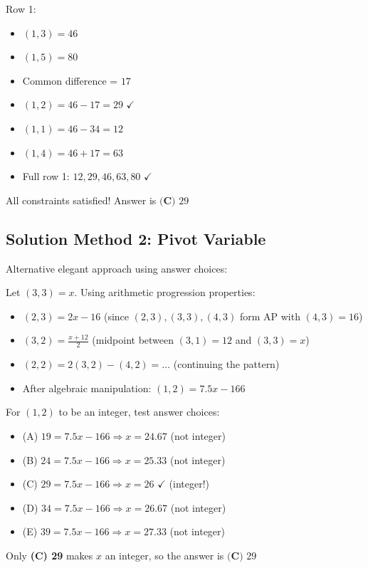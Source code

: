 \documentclass[12pt]{article}
\begin{document}
Row 1:
\begin{itemize}
    \item $(1,3) = 46$
    \item $(1,5) = 80$
    \item Common difference = $17$
    \item $(1,2) = 46 - 17 = 29$ $\checkmark$
    \item $(1,1) = 46 - 34 = 12$
    \item $(1,4) = 46 + 17 = 63$
    \item Full row 1: $12, 29, 46, 63, 80$ $\checkmark$
\end{itemize}

All constraints satisfied! Answer is $\boxed{\textbf{(C) } 29}$

\subsection*{Solution Method 2: Pivot Variable}

Alternative elegant approach using answer choices:

Let $(3,3) = x$. Using arithmetic progression properties:

\begin{itemize}
    \item $(2,3) = 2x - 16$ (since $(2,3), (3,3), (4,3)$ form AP with $(4,3) = 16$)
    \item $(3,2) = \frac{x + 12}{2}$ (midpoint between $(3,1) = 12$ and $(3,3) = x$)
    \item $(2,2) = 2(3,2) - (4,2) = \ldots$ (continuing the pattern)
    \item After algebraic manipulation: $(1,2) = 7.5x - 166$
\end{itemize}

For $(1,2)$ to be an integer, test answer choices:
\begin{itemize}
    \item (A) $19 = 7.5x - 166 \Rightarrow x = 24.67$ (not integer)
    \item (B) $24 = 7.5x - 166 \Rightarrow x = 25.33$ (not integer)
    \item (C) $29 = 7.5x - 166 \Rightarrow x = 26$ $\checkmark$ (integer!)
    \item (D) $34 = 7.5x - 166 \Rightarrow x = 26.67$ (not integer)
    \item (E) $39 = 7.5x - 166 \Rightarrow x = 27.33$ (not integer)
\end{itemize}

Only \textbf{(C) 29} makes $x$ an integer, so the answer is $\boxed{\textbf{(C) } 29}$
\end{document}
